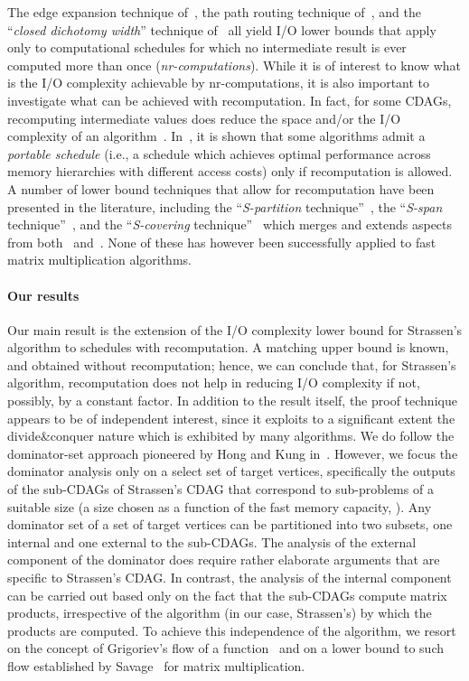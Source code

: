 \documentclass[a4paper,UKenglish]{lipics-v2016}
\newcommand{\io }{I/O }
\begin{document}
The edge expansion technique of~\cite{ballard2012graph}, the path
routing technique of~\cite{scott2015matrix}, and the ``\emph{closed dichotomy
width}'' technique of~\cite{bilardi1999processor} all yield \io lower
bounds that apply only to computational schedules for which no
intermediate result is ever computed more than once
(\emph{nr-computations}). 
While it is of interest to know what is the
\io complexity achievable by nr-computations, it is also
important to investigate what can be achieved with recomputation. In
fact, for some CDAGs, recomputing intermediate values does reduce the
space and/or the \io complexity of an
algorithm~\cite{savage1995extending}.
In~\cite{bilardi2001characterization}, it is shown that some
algorithms admit a \emph{portable schedule} (i.e., a schedule which
achieves optimal performance across memory hierarchies with different
access costs) only if recomputation is allowed. A number of lower
bound techniques that allow for recomputation have been presented in
the literature, including the ``\emph{S-partition}
technique''~\cite{jia1981complexity}, the ``\emph{S-span}
technique''~\cite{savage1995extending}, and the ``\emph{S-covering}
technique''~\cite{bilardi2000space} which merges and extends aspects
from both~\cite{jia1981complexity}
and~\cite{savage1995extending}. None of these has however been
successfully applied to fast matrix multiplication algorithms.

\paragraph*{Our results}

Our main result is the extension of the  \io complexity lower bound for Strassen's algorithm to
schedules with recomputation. A matching upper bound is known, and
obtained without recomputation; hence, we can conclude that, for
Strassen's algorithm, recomputation does not help in reducing \io
complexity if not, possibly, by a constant factor. In addition to the
result itself, the proof technique appears to be of independent
interest, since it exploits to a significant extent the
divide\&conquer nature which is exhibited by many algorithms.  We do
follow the dominator-set approach pioneered by Hong and Kung
in~\cite{jia1981complexity}. However, we focus the dominator analysis
only on a select set of target vertices, specifically the outputs of
the sub-CDAGs of Strassen's CDAG that correspond to sub-problems of a
suitable size (a size chosen as a function of the fast memory
capacity, ).  Any dominator set of a set of target vertices can be
partitioned into two subsets, one internal and one external to the
sub-CDAGs. The analysis of the external component of the dominator does
require rather elaborate arguments that are specific to Strassen's
CDAG. In contrast, the analysis of the internal component can be
carried out based only on the fact that the sub-CDAGs compute matrix
products, irrespective of the algorithm (in our case, Strassen's) by
which the products are computed.  To achieve this independence of the
algorithm, we resort on the concept of Grigoriev's flow of a
function~\cite{grigor1976application} and on a lower bound to such
flow established by Savage~\cite{savage97models} for matrix
multiplication.
\end{document}
